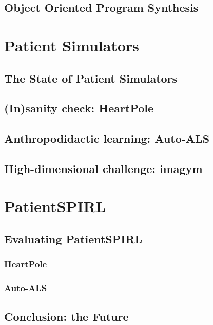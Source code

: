 \newpage
\chapter{Object Oriented Program Synthesis}
\label{ch:oops}

\part{Patient Simulators}
\label{part:simulators}

\newpage
\chapter{The State of Patient Simulators}
\label{ch:simulators-sota}

\newpage
\chapter{(In)sanity check: HeartPole}
\label{ch:heartpole}

\newpage
\chapter{Anthropodidactic learning: Auto-ALS}
\label{ch:auto-als}

\newpage
\chapter{High-dimensional challenge: imagym}
\label{ch:imagym}

\newpage


\part{PatientSPIRL}
\label{part:patientspirl}

\newpage
\chapter{Evaluating PatientSPIRL}
\label{ch:eval}

\section{HeartPole}

\section{Auto-ALS}

\newpage
\chapter{Conclusion: the Future}
\label{ch:conclusion}

\printbibliography


